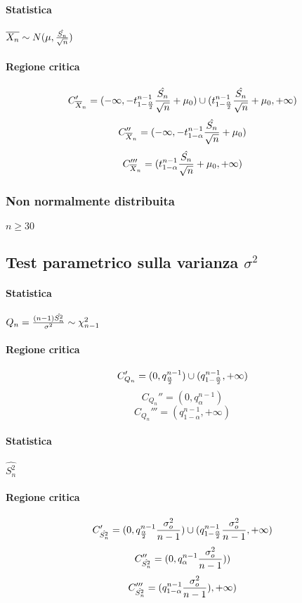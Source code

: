 \documentclass[12pt]{article}
\begin{document}
    \paragraph{Statistica} $\overline{X_n} \sim N(\mu, {\hat{S_n} \over \sqrt{n}})$
    \paragraph{Regione critica} 
    $$C_{\overline{X}_n}' = (-\infty, -t^{n-1}_{1-{\alpha \over 2}} {\hat{S_n} \over \sqrt{n}} + \mu_0) \cup (t^{n-1}_{1-{\alpha \over 2}}{\hat{S_n} \over \sqrt{n}} + \mu_0, +\infty)$$
    $$C_{\overline{X}_n}'' = (-\infty, -t^{n-1}_{1-\alpha}{\hat{S_n} \over \sqrt{n}} + \mu_0)$$
    $$C_{\overline{X}_n}''' = (t^{n-1}_{1-\alpha}{\hat{S_n} \over \sqrt{n}} + \mu_0, +\infty)$$
    \subsubsection{Non normalmente distribuita}
    \paragraph{$n \geq 30$}

    \newpage
    \subsection{Test parametrico sulla varianza $\sigma^2$}
    \paragraph{Statistica} $Q_n = {{(n-1)\hat{S_n^2} \over \sigma^2}} \sim \chi^2_{n-1}$
    \paragraph{Regione critica}
    $$C_{Q_n}' = (0, q_{\alpha \over 2}^{n-1}) \cup (q_{1-{\alpha \over 2}}^{n-1}, +\infty)$$
    $$C_{Q_n}'' = (0, q_\alpha^{n-1})$$
    $$C_{Q_n}''' = (q_{1-\alpha}^{n-1}, +\infty)$$
    \paragraph{Statistica} $\hat{S_n^2}$
    \paragraph{Regione critica}
    $$C_{\hat{S_n^2}}' = (0, q_{\alpha \over 2}^{n-1}{\sigma_o^2 \over {n - 1}}) \cup (q_{1-{\alpha \over 2}}^{n-1}{\sigma_o^2 \over {n-1}}, +\infty)$$
    $$C_{\hat{S_n^2}}'' = (0, q_\alpha^{n-1}{\sigma_o^2 \over {n-1}}))$$
    $$C_{\hat{S_n^2}}''' = (q_{1-\alpha}^{n-1}{\sigma_o^2 \over {n-1}}), +\infty)$$
\end{document}

